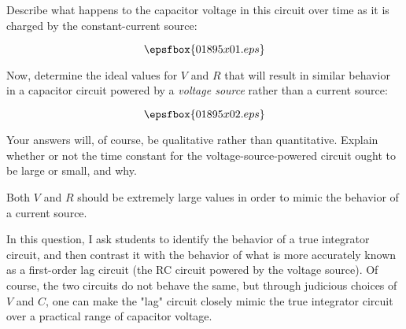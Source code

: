 

Describe what happens to the capacitor voltage in this circuit over time as it is charged by the constant-current source:

$$\epsfbox{01895x01.eps}$$

Now, determine the ideal values for $V$ and $R$ that will result in similar behavior in a capacitor circuit powered by a {\it voltage source} rather than a current source:

$$\epsfbox{01895x02.eps}$$

Your answers will, of course, be qualitative rather than quantitative.  Explain whether or not the time constant for the voltage-source-powered circuit ought to be large or small, and why.







Both $V$ and $R$ should be extremely large values in order to mimic the behavior of a current source.







In this question, I ask students to identify the behavior of a true integrator circuit, and then contrast it with the behavior of what is more accurately known as a first-order lag circuit (the RC circuit powered by the voltage source).  Of course, the two circuits do not behave the same, but through judicious choices of $V$ and $C$, one can make the "lag" circuit closely mimic the true integrator circuit over a practical range of capacitor voltage.




